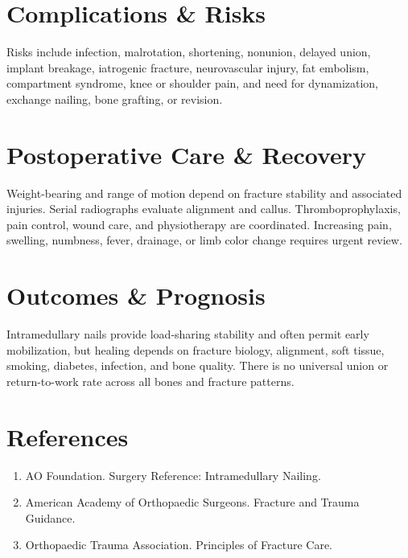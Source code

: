 \section*{Complications \& Risks}
Risks include infection, malrotation, shortening, nonunion, delayed union, implant breakage, iatrogenic fracture, neurovascular injury, fat embolism, compartment syndrome, knee or shoulder pain, and need for dynamization, exchange nailing, bone grafting, or revision.

\section*{Postoperative Care \& Recovery}
Weight-bearing and range of motion depend on fracture stability and associated injuries. Serial radiographs evaluate alignment and callus. Thromboprophylaxis, pain control, wound care, and physiotherapy are coordinated. Increasing pain, swelling, numbness, fever, drainage, or limb color change requires urgent review.

\section*{Outcomes \& Prognosis}
Intramedullary nails provide load-sharing stability and often permit early mobilization, but healing depends on fracture biology, alignment, soft tissue, smoking, diabetes, infection, and bone quality. There is no universal union or return-to-work rate across all bones and fracture patterns.

\section*{References}
\begin{enumerate}
  \item AO Foundation. Surgery Reference: Intramedullary Nailing.
  \item American Academy of Orthopaedic Surgeons. Fracture and Trauma Guidance.
  \item Orthopaedic Trauma Association. Principles of Fracture Care.
\end{enumerate}

\clearpage
